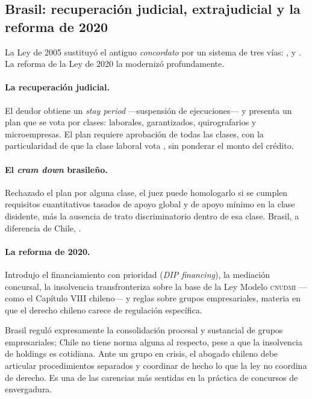 \subsection{Brasil: recuperación judicial, extrajudicial y la reforma de 2020}

La Ley  de 2005 sustituyó el antiguo \emph{concordato} por un sistema de tres vías:
,  y . La
reforma de la Ley  de 2020 la modernizó profundamente.

\paragraph{La recuperación judicial.} El deudor obtiene un \emph{stay period} ---suspensión de
ejecuciones--- y presenta un plan que se vota por clases: laborales, garantizados, quirografarios y
microempresas. El plan requiere aprobación de todas las clases, con la particularidad de que la
clase laboral vota , sin ponderar el monto del crédito.

\paragraph{El \emph{cram down} brasileño.} Rechazado el plan por alguna clase, el juez puede
homologarlo si se cumplen requisitos cuantitativos tasados de apoyo global y de apoyo mínimo en la
clase disidente, más la ausencia de trato discriminatorio dentro de esa clase. Brasil, a diferencia
de Chile, .

\paragraph{La reforma de 2020.} Introdujo el financiamiento con prioridad (\emph{DIP financing}),
la mediación concursal, la insolvencia transfronteriza sobre la base de la Ley Modelo
\textsc{cnudmi} ---como el Capítulo VIII chileno--- y reglas sobre grupos empresariales, materia en
que el derecho chileno carece de regulación específica.

\begin{practica}
Brasil reguló expresamente la consolidación procesal y sustancial de grupos empresariales; Chile no
tiene norma alguna al respecto, pese a que la insolvencia de holdings es cotidiana. Ante un grupo
en crisis, el abogado chileno debe articular procedimientos separados y coordinar de hecho lo que
la ley no coordina de derecho. Es una de las carencias más sentidas en la práctica de concursos de
envergadura.
\end{practica}

